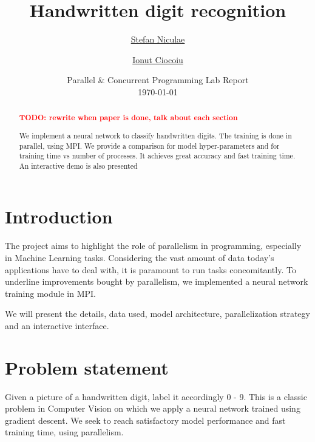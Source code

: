 \documentclass[a4paper]{article}
\newcommand{\TODO}[1]{\noindent \textbf{\textcolor{red}{TODO: #1}}}
\begin{document}
	\title{
	\Huge Handwritten digit recognition
	}
	
	\vspace{2cm}
	
	\author{\Large \href{mailto:stefan.niculae@my.fmi.unibuc.ro}{Stefan Niculae} \and \Large \href{mailto:ionut.ciocoiu@my.fmi.unibuc.ro}{Ionut Ciocoiu}
	\vspace{3cm}}
	
	\date{
	\large Parallel \& Concurrent Programming Lab Report \\
    \vspace{0.2cm}
	\today
	}

	\maketitle

\vspace{5cm}
\begin{abstract}
\TODO{rewrite when paper is done, talk about each section}

We implement a neural network to classify handwritten digits. The training is done in parallel, using MPI. We provide a comparison for model hyper-parameters and for training time vs number of processes. It achieves great accuracy and fast training time. An interactive demo is also presented
\end{abstract}






\newpage
\section{Introduction}
The project aims to highlight the role of parallelism in programming, especially in Machine Learning tasks. Considering the vast amount of data today's applications have to deal with, it is paramount to run tasks concomitantly. To underline  improvements bought by parallelism, we implemented  a neural network training module in MPI.
 
 
We will present the details, data used, model architecture, parallelization strategy and an interactive interface. 

\section{Problem statement}
\label{sec:problem}
Given a picture of a handwritten digit, label it accordingly 0 - 9.
This is a classic problem in Computer Vision on which we apply a neural network trained using gradient descent. We seek to reach satisfactory model performance and fast training time, using parallelism.
\end{document}
